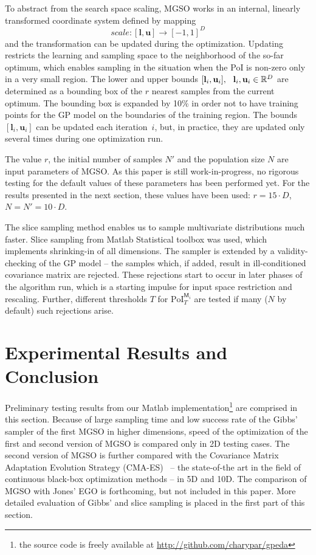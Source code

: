 \documentclass{itatnew}
\begin{document}
To abstract from the search space scaling, MGSO works in an internal, linearly transformed coordinate system defined by mapping
\begin{equation}
\mathit{scale}:[\mathbf{l}, \mathbf{u}] \rightarrow [-1, 1]^D
\end{equation}
and the transformation can be updated during the optimization. Updating restricts the learning and sampling space to the neighborhood of the so-far optimum, which enables sampling in the situation when the PoI is non-zero only in a very small region. The lower and upper bounds $[\mathbf{l}_i, \mathbf{u}_i], \hspace{0.7em} \mathbf{l}_i,\mathbf{u}_i \in \mathbb{R}^D$ are determined as a bounding box of the $r$ nearest samples from the current optimum. 
The bounding box is expanded by 10\% in order not to have training points for the GP model on the boundaries of the training region.
The bounds $[\mathbf{l}_i, \mathbf{u}_i]$ can be updated each iteration~$i$, but, in practice, they are updated only several times during one optimization run.

The value $r$, the initial number of samples $N'$ and the population size $N$ are input parameters of MGSO. As this paper is still work-in-progress, no rigorous testing for the default values of these parameters has been performed yet. For the results presented in the next section, these values have been used: $r = 15 \cdot D$, $N = N' = 10 \cdot D$.


  The slice sampling method enables us to sample multivariate distributions much faster. Slice sampling from Matlab Statistical toolbox was used, which implements shrinking-in of all dimensions. The sampler is extended by a validity-checking of the GP model -- the samples which, if added, result in ill-con\-di\-tion\-ed covariance matrix are rejected. These rejections start to occur in later phases of the algorithm run, which is a starting impulse for input space restriction and rescaling. Further, different thresholds $T$ for $\mathrm{PoI}_T^{\mathsf{M}_i}$ are tested if many ($N$ by default) such rejections arise.

\section{Experimental Results and Conclusion}
\label{sec:results}

Preliminary testing results from our Matlab implementation\footnote{the source code is freely available at \url{http://github.com/charypar/gpeda}} are comprised in this section. Because of large sampling time and low success rate of the Gibbs' sampler of the first MGSO in higher dimensions, speed of the optimization of the first and second version of MGSO is compared only in 2D testing cases. The second version of MGSO is further compared with the Covariance Matrix Adaptation Evolution Strategy (CMA-ES)~\cite{hansen_completely_2001} -- the state-of-the art in the field of continuous black-box optimization methods -- in 5D and 10D. The comparison of MGSO with Jones' EGO is forthcoming, but not included in this paper. More detailed evaluation of Gibbs' and slice sampling is placed in the first part of this section.
\end{document}
